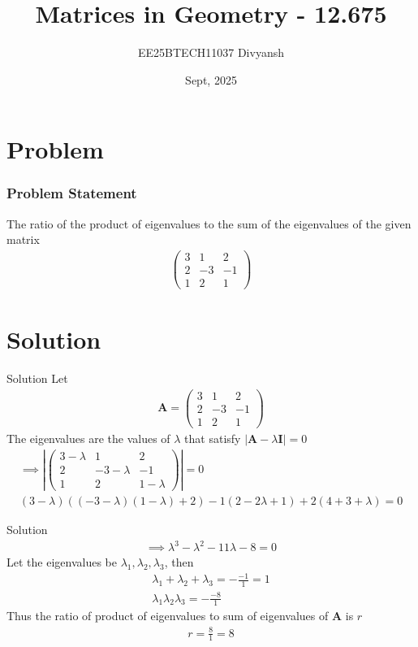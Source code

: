 \documentclass{beamer}
\title{Matrices in Geometry - 12.675}
\author{EE25BTECH11037  Divyansh}
\date{Sept, 2025}
\renewcommand{\vec}[1]{\mathbf{#1}}
\providecommand{\brak}[1]{\ensuremath{\left(#1\right)}}
\theoremstyle{remark}
\providecommand{\abs}[1]{\left\vert#1\right\vert}
\newcommand{\myvec}[1]{\ensuremath{\begin{pmatrix}#1\end{pmatrix}}}
\begin{document}
\maketitle


\section{Problem}
\begin{frame}
\frametitle{Problem Statement}
The ratio of the product of eigenvalues to the sum of the eigenvalues of the given matrix 
\begin{align*}
    \myvec{3&1&2\\2&-3&-1\\1&2&1}
\end{align*}
\end{frame}

\section{Solution}
\begin{frame}{Solution}
Let 
\begin{align}
    \vec{A}=\myvec{3&1&2\\2&-3&-1\\1&2&1}
\end{align}
The eigenvalues are the values of $\lambda$ that satisfy $\abs{ \vec{A} - \lambda\vec{I}} = 0$
\begin{align}
    \implies \abs{\myvec{3-\lambda&1&2\\2&-3-\lambda&-1\\1&2&1-\lambda}}=0\\
     \brak{3-\lambda}\brak{ \brak{-3-\lambda}\brak{1-\lambda} +2} - 1\brak{2-2\lambda + 1} + 2\brak{4 + 3 + \lambda}=0
     \end{align}
\end{frame}
\begin{frame}{Solution}
  \begin{align}
    \implies \lambda^3 - \lambda^2 - 11\lambda - 8 = 0
\end{align}
Let the eigenvalues be $\lambda_1, \lambda_2  , \lambda_3$, then
\begin{align}
    \lambda_1+ \lambda_2  + \lambda_3 = -\frac{-1}{1} =1\\
    \lambda_1 \lambda_2   \lambda_3 = -\frac{-8}{1}
\end{align}
Thus the ratio of product of eigenvalues to sum of eigenvalues of $\vec{A}$ is $r$
\begin{align}
    r=\frac{8}{1} = 8
\end{align}  
\end{frame}
\end{document}
